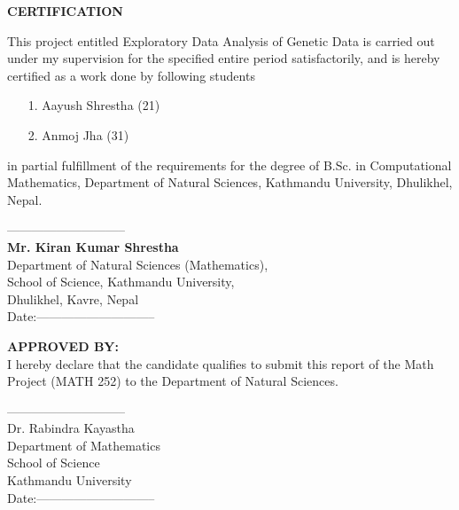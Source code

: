 



\begin{center}
	{\Large{\bf{ CERTIFICATION}}}
\end{center}


\noindent
This project entitled Exploratory Data Analysis of Genetic Data is carried out  under my supervision for the specified entire period satisfactorily, and is hereby certified as a work done by following students
\begin{itemize}
\item[1.] Aayush Shrestha (21)
\item[2.] Anmoj Jha (31)
\end{itemize}
 in partial fulfillment of the requirements for the degree of B.Sc. in Computational Mathematics, Department of Natural Sciences, Kathmandu University, Dhulikhel, Nepal.

\vspace{2.0cm}

\noindent
-----------------------------\\
{\bf Mr. Kiran Kumar Shrestha}\\
Department of Natural Sciences (Mathematics),\\
School of Science, Kathmandu University,\\
Dhulikhel, Kavre, Nepal\\
Date:-----------------------------\\

\vspace{2cm}

\noindent
{\bf APPROVED BY:}\\
I hereby declare that the candidate qualifies to submit this  report of the  Math Project (MATH 252) to the Department of Natural Sciences. 



\vspace{2cm}

\noindent
-----------------------------\\
Dr. Rabindra Kayastha\\
Department of Mathematics\\
School of Science\\
Kathmandu University\\
Date:-----------------------------\\
  